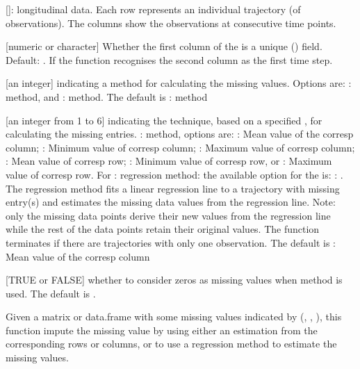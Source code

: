 \documentclass[a4paper]{book}
\begin{document}
\begin{Arguments}
\begin{ldescription}
\item[\code{traj}] [\code{matrix (numeric)}]: longitudinal data. Each row represents an individual trajectory (of observations). The columns show the observations at consecutive time points.

\item[\code{id\_field}] [numeric or character] Whether the first column of the  is a unique () field. Default: . If  the function recognises the second column as the first time step.

\item[\code{method}] [an integer] indicating a method for calculating the missing values. Options are: :  method, and :  method. The default is :  method

\item[\code{replace\_with}] [an integer from 1 to 6] indicating the technique, based on a specified , for calculating the missing entries.
:  method,  options are: : Mean value of the corresp column;
: Minimum value of corresp column; : Maximum value of corresp column;
: Mean value of corresp row; : Minimum value of corresp row,
or : Maximum value of corresp row. For : regression method:
the available option for the  is: : .
The regression method fits a linear regression line to a trajectory with missing entry(s)
and estimates the missing data values from the regression line.
Note: only the missing data points derive their new values from the regression line
while the rest of the data points retain their original values. The function terminates if there are
trajectories with only one observation. The default is : Mean value of the corresp column

\item[\code{fill\_zeros}] [TRUE or FALSE] whether to consider zeros  as missing values when  method is used. The default is .
\end{ldescription}
\end{Arguments}
%
\begin{Details}\relax
Given a matrix or data.frame with some missing values indicated by (, , ), this function impute the missing value by using either an estimation from the corresponding rows or columns, or to use a regression method to estimate the missing values.
\end{Details}
\end{document}

